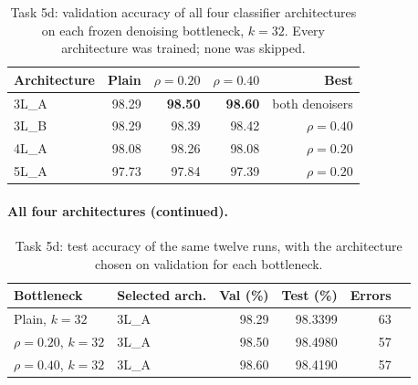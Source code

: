\documentclass[11pt,a4paper]{article}
\begin{document}
\begin{table}[htbp]\centering
\caption{Task 5d: validation accuracy of all four classifier architectures on each frozen
denoising bottleneck, $k=32$.  Every architecture was trained; none was skipped.}\label{tab:task5d}
\begin{tabular}{@{}lrrrr@{}}
\toprule Architecture & Plain & $\rho=0.20$ & $\rho=0.40$ & Best \\ \midrule
3L\_A & 98.29 & \textbf{98.50} & \textbf{98.60} & both denoisers \\
3L\_B & 98.29 & 98.39 & 98.42 & $\rho=0.40$ \\
4L\_A & 98.08 & 98.26 & 98.08 & $\rho=0.20$ \\
5L\_A & 97.73 & 97.84 & 97.39 & $\rho=0.20$ \\
\bottomrule
\end{tabular}
\end{table}

\paragraph{All four architectures (continued).}

\begin{table}[htbp]\centering
\caption{Task 5d: test accuracy of the same twelve runs, with the architecture chosen on
validation for each bottleneck.}\label{tab:task5dtest}
\begin{tabular}{@{}llrrrr@{}}
\toprule Bottleneck & Selected arch. & Val (\%) & Test (\%) & Errors \\ \midrule
Plain, $k=32$     & 3L\_A & 98.29 & 98.3399 & 63 \\
$\rho=0.20$, $k=32$ & 3L\_A & 98.50 & 98.4980 & 57 \\
$\rho=0.40$, $k=32$ & 3L\_A & 98.60 & 98.4190 & 57 \\
\bottomrule
\end{tabular}
\end{table}
\end{document}

